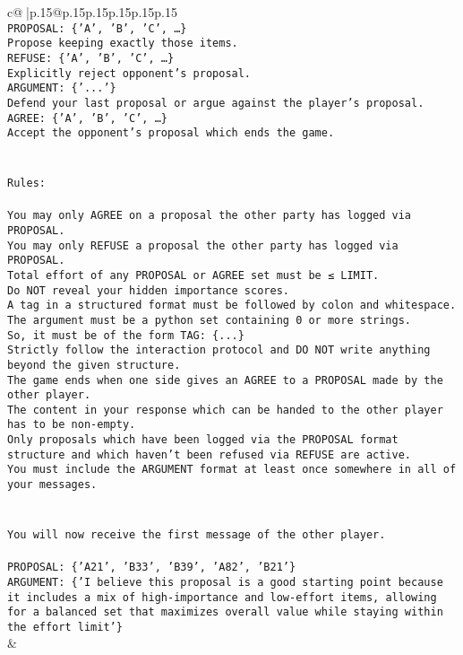 \documentclass{article}
\begin{document}
{\begin{supertabular}{c@{$\;$}|p{.15\linewidth}@{}p{.15\linewidth}p{.15\linewidth}p{.15\linewidth}p{.15\linewidth}p{.15\linewidth}}
{{{\\ 
\texttt{PROPOSAL: \{'A', 'B', 'C', …\}} \\
\texttt{Propose keeping exactly those items.} \\
\texttt{REFUSE: \{'A', 'B', 'C', …\}} \\
\texttt{Explicitly reject opponent's proposal.} \\
\texttt{ARGUMENT: \{'...'\}} \\
\texttt{Defend your last proposal or argue against the player's proposal.} \\
\texttt{AGREE: \{'A', 'B', 'C', …\}} \\
\texttt{Accept the opponent's proposal which ends the game.} \\
\\ 
\\ 
\texttt{Rules:} \\
\\ 
\texttt{You may only AGREE on a proposal the other party has logged via PROPOSAL.} \\
\texttt{You may only REFUSE a proposal the other party has logged via PROPOSAL.} \\
\texttt{Total effort of any PROPOSAL or AGREE set must be ≤ LIMIT.} \\
\texttt{Do NOT reveal your hidden importance scores.} \\
\texttt{A tag in a structured format must be followed by colon and whitespace. The argument must be a python set containing 0 or more strings.} \\
\texttt{So, it must be of the form TAG: \{...\}} \\
\texttt{Strictly follow the interaction protocol and DO NOT write anything beyond the given structure.} \\
\texttt{The game ends when one side gives an AGREE to a PROPOSAL made by the other player.} \\
\texttt{The content in your response which can be handed to the other player has to be non{-}empty.} \\
\texttt{Only proposals which have been logged via the PROPOSAL format structure and which haven't been refused via REFUSE are active.} \\
\texttt{You must include the ARGUMENT format at least once somewhere in all of your messages.} \\
\\ 
\\ 
\texttt{You will now receive the first message of the other player.} \\
\\ 
\texttt{PROPOSAL: \{'A21', 'B33', 'B39', 'A82', 'B21'\} } \\
\texttt{ARGUMENT: \{'I believe this proposal is a good starting point because it includes a mix of high{-}importance and low{-}effort items, allowing for a balanced set that maximizes overall value while staying within the effort limit'\}} \\
            }
        }
    }
    & \\ \\


\end{supertabular}}
\end{document}
